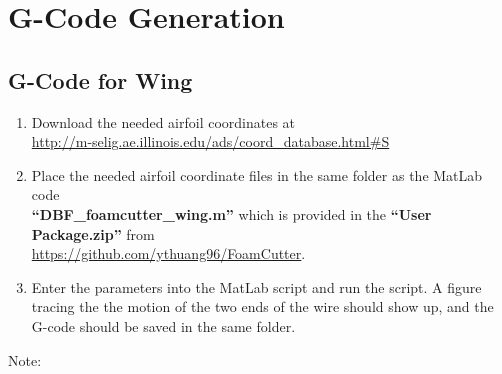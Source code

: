 \documentclass[titlepage,12pt,letter]{report}
\numberwithin{equation}{chapter}
\begin{document}
\section{G-Code Generation}
\label{sec:gcode}
\subsection{G-Code for Wing}
\begin{enumerate}[itemsep = 5pt,topsep=0pt] 
	\item Download the needed airfoil coordinates at \\ \href{http://m-selig.ae.illinois.edu/ads/coord_database.html#S}{http://m-selig.ae.illinois.edu/ads/coord\_database.html\#S}
	\item Place the needed airfoil coordinate files in the same folder as the MatLab code \\ \textbf{``DBF\_foamcutter\_wing.m''} which is provided in the \textbf{``User Package.zip''} from \\ \href{https://github.com/ythuang96/FoamCutter}{https://github.com/ythuang96/FoamCutter}.
	\item Enter the parameters into the MatLab script and run the script. A figure tracing the the motion of the two ends of the wire should show up, and the G-code should be saved in the same folder.
\end{enumerate}

\noindent Note:
\end{document}
